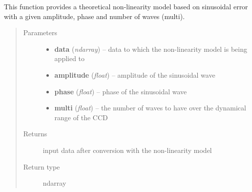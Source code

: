 \documentclass[a4paper,11pt,english]{sphinxmanual}
\begin{document}
\begin{fulllineitems}
\label{instrument:support.VISinstrumentModel.CCDnonLinearityModelSinusoidal}
This function provides a theoretical non-linearity model based on sinusoidal error with a given
amplitude, phase and number of waves (multi).
\begin{quote}\begin{description}
\item[{Parameters}] \leavevmode\begin{itemize}
\item {} 
\textbf{data} (\emph{ndarray}) -- data to which the non-linearity model is being applied to

\item {} 
\textbf{amplitude} (\emph{float}) -- amplitude of the sinusoidal wave

\item {} 
\textbf{phase} (\emph{float}) -- phase of the sinusoidal wave

\item {} 
\textbf{multi} (\emph{float}) -- the number of waves to have over the dynamical range of the CCD

\end{itemize}

\item[{Returns}] \leavevmode
input data after conversion with the non-linearity model

\item[{Return type}] \leavevmode
ndarray

\end{description}\end{quote}

\end{fulllineitems}

\end{document}
